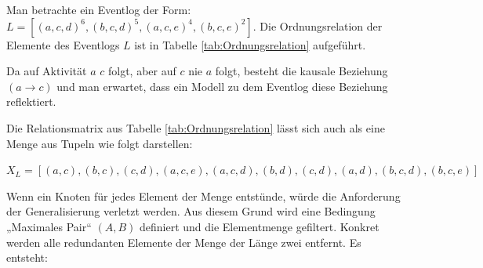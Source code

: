 Man betrachte ein Eventlog der Form: $L = [(a, c, d)^6, (b, c, d)^5, (a, c, e)^4, (b, c, e)^2]$.
Die Ordnungsrelation der Elemente des Eventlogs $L$ ist in Tabelle \ref{tab:Ordnungsrelation} aufgeführt.
\begin{table}[!ht]
\centering
{}
\caption{Ordnungsrelation zu einem Eventlog $L$ auf Basis des $\alpha$-Miner Verfahrens}
\label{tab:Ordnungsrelation}
\end{table}
\newline
Da auf Aktivität $a$ $c$ folgt, aber auf $c$ nie $a$ folgt, besteht die kausale Beziehung $(a→c)$ und man erwartet, dass ein Modell zu dem Eventlog diese Beziehung reflektiert.

Die Relationsmatrix aus Tabelle \ref{tab:Ordnungsrelation} lässt sich auch als eine Menge aus Tupeln wie folgt darstellen:

$ X_L={ [({a}, {c}), ({b}, {c}), ({c}, {d}), ({a}, {c, e}),
({a}, {c, d}), ({b}, {d}), ({c}, {d}), ({a}, {d}),
({b, c}, {d}), ({b, c}, {e}) ]}$

Wenn ein Knoten für jedes Element der Menge entstünde, würde die Anforderung der Generalisierung verletzt werden. Aus diesem Grund wird eine Bedingung „Maximales Pair“ $(A,B)$ definiert und die Elementmenge gefiltert. Konkret werden alle redundanten Elemente der Menge der Länge zwei entfernt. Es entsteht:


